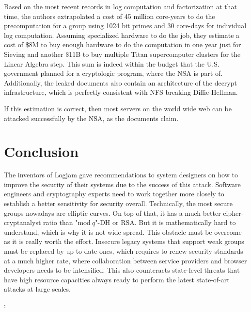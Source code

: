 \documentclass[paper=a4, fontsize=11pt]{scrartcl} %
\numberwithin{equation}{section} %
\numberwithin{figure}{section} %
\numberwithin{table}{section} %
\begin{document}
Based on the most recent records in log computation and factorization at that time, the authors extrapolated a cost of 45 million core-years to do the precomputation for a group using 1024 bit primes and 30 core-days for individual log computation. Assuming specialized hardware to do the job, they estimate a cost of \$8M to buy enough hardware to do the computation in one year just for Sieving and another \$11B to buy multiple Titan supercomputer clusters for the Linear Algebra step. This sum is indeed within the budget that the U.S. government planned for a cryptologic program, where the NSA is part of. Additionally, the leaked documents also contain an architecture of the decrypt infrastructure, which is perfectly consistent with NFS breaking Diffie-Hellman.

If this estimation is correct, then most servers on the world wide web can be attacked successfully by the NSA, as the documents claim.

\section{Conclusion}
The inventors of Logjam gave recommendations to system designers on how to improve the security of their systems due to the success of this attack. Software engineers and cryptography experts need to work together more closely to establish a better sensitivity for security overall. Technically, the most secure groups nowadays are elliptic curves. On top of that, it has a much better cipher-cryptanalyst ratio than "$\mathrm{mod}\ q$"-DH or RSA. But it is mathematically hard to understand, which is why it is not wide spread. This obstacle must be overcome as it is really worth the effort. Insecure legacy systems that support weak groups must be replaced by up-to-date ones, which requires to renew security standards at a much higher rate, where collaboration between service providers and browser developers needs to be intensified. This also counteracts state-level threats that have high resource capacities always ready to perform the latest state-of-art attacks at large scales.


\newpage



\newpage
{}%
\clearpage
\thispagestyle{empty}
\noindent \textbf{\underline{}}:\\
\end{document}
